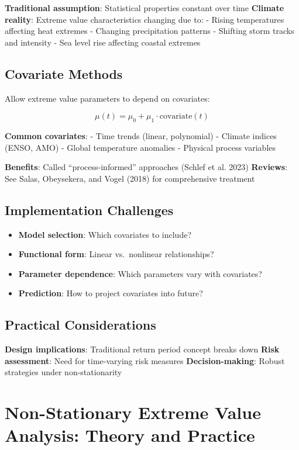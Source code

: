 \documentclass[
  letterpaper,
  DIV=11,
  numbers=noendperiod]{scrreprt}
\providecommand{\tightlist}{%
  \setlength{\itemsep}{0pt}\setlength{\parskip}{0pt}}
\begin{document}
\textbf{Traditional assumption}: Statistical properties constant over
time \textbf{Climate reality}: Extreme value characteristics changing
due to: - Rising temperatures affecting heat extremes - Changing
precipitation patterns - Shifting storm tracks and intensity - Sea level
rise affecting coastal extremes

\subsection{Covariate Methods}\label{covariate-methods}

Allow extreme value parameters to depend on covariates:

\[\mu(t) = \mu_0 + \mu_1 \cdot \text{covariate}(t)\]

\textbf{Common covariates}: - Time trends (linear, polynomial) - Climate
indices (ENSO, AMO) - Global temperature anomalies - Physical process
variables

\textbf{Benefits}: Called ``process-informed'' approaches (Schlef et al.
2023) \textbf{Reviews}: See Salas, Obeysekera, and Vogel (2018) for
comprehensive treatment

\subsection{Implementation Challenges}\label{implementation-challenges}

\begin{itemize}
\tightlist
\item
  \textbf{Model selection}: Which covariates to include?
\item
  \textbf{Functional form}: Linear vs.~nonlinear relationships?
\item
  \textbf{Parameter dependence}: Which parameters vary with covariates?
\item
  \textbf{Prediction}: How to project covariates into future?
\end{itemize}

\subsection{Practical Considerations}\label{practical-considerations}

\textbf{Design implications}: Traditional return period concept breaks
down \textbf{Risk assessment}: Need for time-varying risk measures
\textbf{Decision-making}: Robust strategies under non-stationarity

\section{Non-Stationary Extreme Value Analysis: Theory and
Practice}\label{non-stationary-extreme-value-analysis-theory-and-practice}
\end{document}

